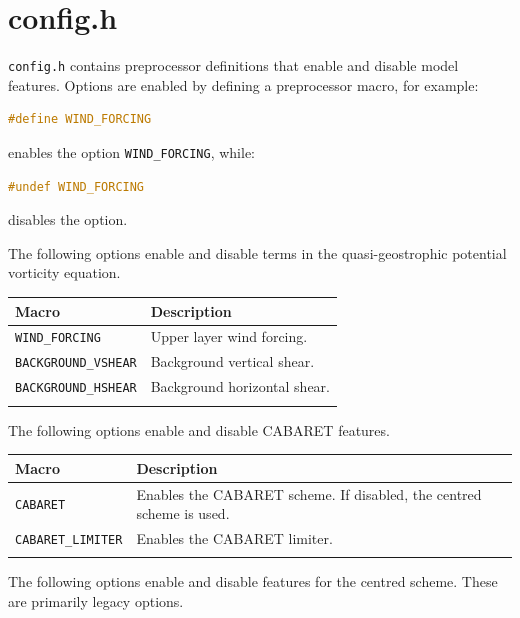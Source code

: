 \documentclass[a4paper]{book}
\begin{document}
\section{config.h}\label{sect:config}

\verb+config.h+ contains preprocessor definitions that enable and disable model
features. Options are enabled by defining a preprocessor macro, for example:
\begin{lstlisting}[language = C, frame = single]
#define WIND_FORCING
\end{lstlisting}
enables the option \verb+WIND_FORCING+, while:
\begin{lstlisting}[language = C, frame = single]
#undef WIND_FORCING
\end{lstlisting}
disables the option.

The following options enable and disable terms in the quasi-geostrophic
potential vorticity equation.

\begin{longtable}{ | p{} | p{} | }
  \hline
  Macro & Description \\
  \hline
  \endhead
  \verb+WIND_FORCING+      & Upper layer wind forcing. \\
  \verb+BACKGROUND_VSHEAR+ & Background vertical shear. \\
  \verb+BACKGROUND_HSHEAR+ & Background horizontal shear. \\

  \hline
  \endfoot
\end{longtable}

The following options enable and disable CABARET features.

\begin{longtable}{ | p{} | p{} | }
  \hline
  Macro & Description \\
  \hline
  \endhead
  \verb+CABARET+         & Enables the CABARET scheme. If disabled, the centred
                           scheme is used. \\
  \verb+CABARET_LIMITER+ & Enables the CABARET limiter. \\

  \hline
  \endfoot
\end{longtable}

The following options enable and disable features for the centred scheme. These
are primarily legacy options.
\end{document}
